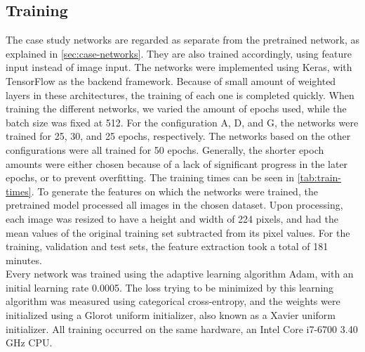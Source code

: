 
\subsection{Training} \label{case-training}



The case study networks are regarded as separate from the pretrained network, as explained in \autoref{sec:case-networks}. They are also trained accordingly, using feature input instead of image input. The networks were implemented using Keras, with TensorFlow as the backend framework. Because of small amount of weighted layers in these architectures, the training of each one is completed quickly. When training the different networks, we varied the amount of epochs used, while the batch size was fixed at 512. For the configuration A, D, and G, the networks were trained for 25, 30, and 25 epochs, respectively. The networks based on the other configurations were all trained for 50 epochs. Generally, the shorter epoch amounts were either chosen because of a lack of significant progress in the later epochs, or to prevent overfitting. The training times can be seen in \autoref{tab:train-times}. To generate the features on which the networks were trained, the pretrained model processed all images in the chosen dataset. Upon processing, each image was resized to have a height and width of 224 pixels, and had the mean values of the original training set subtracted from its pixel values. For the training, validation and test sets, the feature extraction took a total of 181 minutes. \\

\noindent Every network was trained using the adaptive learning algorithm Adam, with an initial learning rate 0.0005. The loss trying to be minimized by this learning algorithm was measured using categorical cross-entropy, and the weights were initialized using a Glorot uniform initializer, also known as a Xavier uniform initializer. All training occurred on the same hardware, an Intel\textregistered{} Core\texttrademark{} i7-6700 3.40 GHz CPU. 



